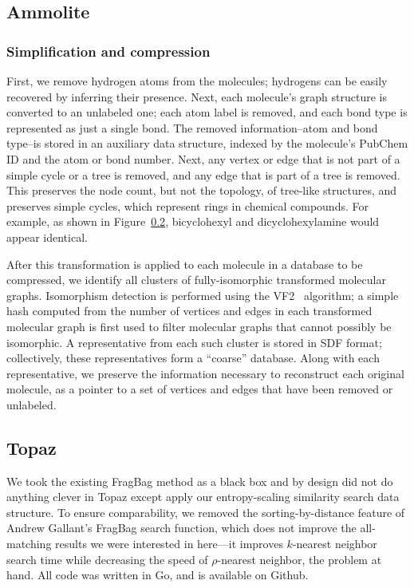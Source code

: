 \documentclass[review,preprint,12pt]{elsarticle}
\renewcommand{\cite}{\citep} %
\theoremstyle{definition}
\theoremstyle{remark}
\numberwithin{equation}{section}
\begin{document}
\subsection{Ammolite}

\subsubsection{Simplification and compression}

First, we remove hydrogen atoms from the molecules; hydrogens can be easily recovered by inferring their 
presence.
Next, each molecule's graph structure is converted to an unlabeled one; each atom label is removed, and each
bond type is represented as just a single bond.
The removed information--atom and bond type--is stored in an auxiliary data structure, indexed by the molecule's
PubChem ID and the atom or bond number.
Next, any vertex or edge that is not part of a simple cycle or a tree is removed, and any edge that is part
of a tree is removed.
This preserves the node count, but not the topology, of tree-like structures, and preserves simple cycles,
which represent rings in chemical compounds.
For example, as shown in Figure~\ref{}, bicyclohexyl and dicyclohexylamine would appear identical.

After this transformation is applied to each molecule in a database to be compressed, we identify all clusters
of fully-isomorphic transformed molecular graphs.
Isomorphism detection is performed using the VF2~\cite{cordella2001improved} 
algorithm; a simple hash computed from the
number of vertices and edges in each transformed molecular graph is first used 
to filter molecular graphs that cannot possibly be isomorphic.
A representative from each such cluster is stored in SDF format; collectively, these representatives form a 
``coarse'' database.
Along with each representative, we preserve the information necessary to reconstruct each original molecule,
as a pointer to a set of vertices and edges that have been removed or unlabeled.

\subsection{Topaz}
We took the existing FragBag method as a black box and by design did not do anything clever in Topaz except apply our entropy-scaling similarity search data structure.
To ensure comparability, we removed the sorting-by-distance feature of Andrew Gallant's FragBag search function, which does not improve the all-matching results we were interested in here---it improves $k$-nearest neighbor search time while decreasing the speed of $\rho$-nearest neighbor, the problem at hand.
All code was written in Go, and is available on Github.
\end{document}
